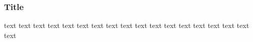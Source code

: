 \documentclass[unknownkeysallowed]{beamer}
\begin{document}

\begin{frame}
\frametitle{Title~}
 \begin{adjustbox}{width=\textwidth,height=\textheight,keepaspectratio}
     text text text text text text text text text text text text text text text text text text 
    \end{adjustbox}
\end{frame}

\end{document}
